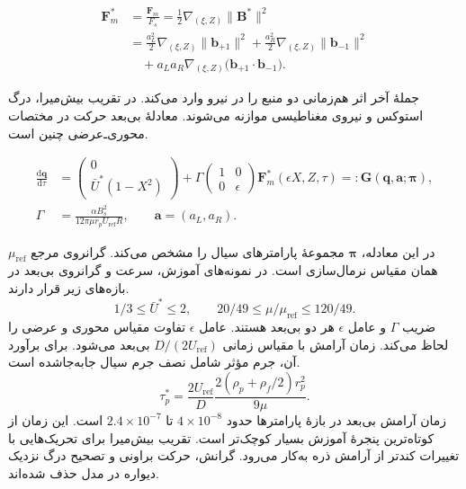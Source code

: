 \begin{equation}
\begin{aligned}
\mathbf F_m^*&=\frac{\mathbf F_m}{F_s}
=\frac12\nabla_{(\xi,Z)}\|\mathbf B^*\|^2\\
&=\frac{a_L^2}{2}\nabla_{(\xi,Z)}\|\mathbf b_{+1}\|^2
 +\frac{a_R^2}{2}\nabla_{(\xi,Z)}\|\mathbf b_{-1}\|^2\\
&\quad+a_La_R\nabla_{(\xi,Z)}
 \big(\mathbf b_{+1}\!\cdot\mathbf b_{-1}\big).
\end{aligned}
\label{eq:forward-mag-force}
\end{equation}

جملهٔ آخر اثر هم‌زمانی دو منبع را در نیرو وارد می‌کند.
در تقریب بیش‌میرا، درگ استوکس و نیروی مغناطیسی موازنه می‌شوند.
معادلهٔ بی‌بعد حرکت در مختصات محوری‌ـ‌عرضی چنین است.

\begin{equation}
\begin{aligned}
\frac{\mathrm d\mathbf q}{\mathrm d\tau}
&=\begin{pmatrix}0\\\bar U^*(1-X^2)\end{pmatrix}
+\Gamma
  \begin{pmatrix}1&0\\0&\epsilon\end{pmatrix}
  \mathbf F_m^*(\epsilon X,Z,\tau)
=:\mathbf G(\mathbf q,\mathbf a;\boldsymbol\pi),\\
\Gamma&=\frac{\alpha B_s^2}{12\pi\mu r_p U_{\mathrm{ref}}R},
\qquad \mathbf a=(a_L,a_R).
\end{aligned}
\label{eq:forward-mag-motion}
\end{equation}

در این معادله، $\boldsymbol\pi$ مجموعهٔ پارامترهای سیال را مشخص می‌کند.
گرانروی مرجع $\mu_{\mathrm{ref}}$ همان مقیاس نرمال‌سازی  است.
در نمونه‌های آموزش، سرعت و گرانروی بی‌بعد در بازه‌های زیر قرار دارند.
\[
1/3\le\bar U^*\le2,\qquad
20/49\le \mu/\mu_{\mathrm{ref}}\le120/49.
\]
ضریب $\Gamma$ و عامل $\epsilon$ هر دو بی‌بعد هستند.
عامل $\epsilon$ تفاوت مقیاس محوری و عرضی را لحاظ می‌کند.
زمان آرامش با مقیاس زمانی $D/(2U_{\mathrm{ref}})$ بی‌بعد می‌شود.
برای برآورد آن، جرم مؤثر شامل نصف جرم سیال جابه‌جاشده است.
\[
\tau_p^*=
\frac{2U_{\mathrm{ref}}}{D}
\frac{2(\rho_p+\rho_f/2)r_p^2}{9\mu}.
\]
زمان آرامش بی‌بعد در بازهٔ پارامترها حدود $4\times10^{-8}$ تا $2.4\times10^{-7}$ است.
این زمان از کوتاه‌ترین پنجرهٔ آموزش بسیار کوچک‌تر است.
تقریب بیش‌میرا برای تحریک‌هایی با تغییرات کندتر از آرامش ذره به‌کار می‌رود.
گرانش، حرکت براونی و تصحیح درگ نزدیک دیواره در مدل حذف شده‌اند.

